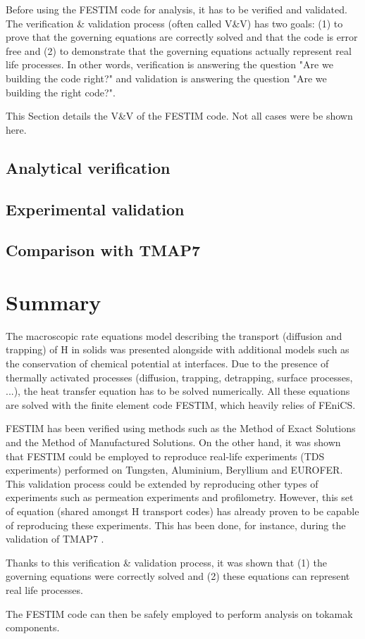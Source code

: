Before using the FESTIM code for analysis, it has to be verified and validated.
The verification \& validation process (often called V\&V) has two goals: (1) to prove that the governing equations are correctly solved and that the code is error free and (2) to demonstrate that the governing equations actually represent real life processes.
In other words, verification is answering the question "Are we building the code right?" and validation is answering the question "Are we building the right code?".

This Section details the V\&V of the FESTIM code.
Not all cases were be shown here.

\subsection{Analytical verification}



\subsection{Experimental validation}



\subsection{Comparison with TMAP7}



\section{Summary}

The macroscopic rate equations model describing the transport (diffusion and trapping) of H in solids was presented alongside with additional models such as the conservation of chemical potential at interfaces.
Due to the presence of thermally activated processes (diffusion, trapping, detrapping, surface processes, ...), the heat transfer equation has to be solved numerically.
All these equations are solved with the finite element code FESTIM, which heavily relies of FEniCS.

FESTIM has been verified using methods such as the Method of Exact Solutions and the Method of Manufactured Solutions.
On the other hand, it was shown that FESTIM could be employed to reproduce real-life experiments (TDS experiments) performed on Tungsten, Aluminium, Beryllium and EUROFER.
This validation process could be extended by reproducing other types of experiments such as permeation experiments and profilometry.
However, this set of equation (shared amongst H transport codes) has already proven to be capable of reproducing these experiments.
This has been done, for instance, during the validation of TMAP7 .

Thanks to this verification \& validation process, it was shown that (1) the governing equations were correctly solved and (2) these equations can represent real life processes.

The FESTIM code can then be safely employed to perform analysis on tokamak components.
